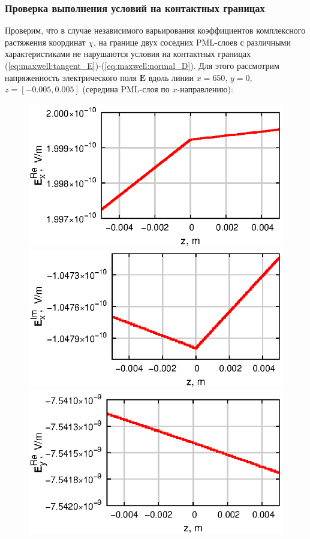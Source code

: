\documentclass[a4paper,12pt]{article}
\begin{document}
\subsubsection{Проверка выполнения условий на контактных границах}
Проверим, что в случае независимого варьирования коэффициентов комплексного растяжения координат $\chi$, на границе двух соседних PML-слоев с различными характеристиками не нарушаются условия на контактных границах (\ref{eq:maxwell:tangent_E})-(\ref{eq:maxwell:normal_D}). Для этого рассмотрим напряженность электрического поля $\mathbf{E}$ вдоль линии $x = 650$, $y = 0$, $z = [-0.005, 0.005]$ (середина PML-слоя по $x$-направлению):
\begin{figure}[H]
	\centering
	\includegraphics[scale=1]{research-2/650/ExR.eps}
	\includegraphics[scale=1]{research-2/650/ExI.eps}
	\includegraphics[scale=1]{research-2/650/EyR.eps}

\end{figure}
\end{document}
